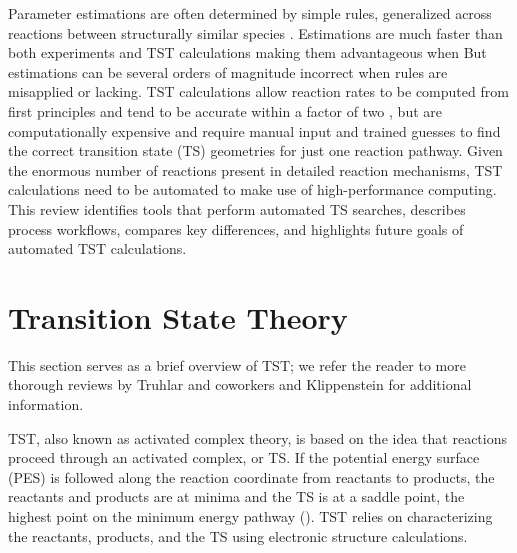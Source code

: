\documentclass[preprint, 11pt]{elsarticle} %
\begin{document}
Parameter estimations are often determined by simple rules, generalized across reactions between structurally similar species \cite{Curran:1998bx, cai:2014}. 
Estimations are much faster than both experiments and TST calculations making them advantageous when 
But estimations can be several orders of magnitude incorrect when rules are misapplied or lacking.
TST calculations allow reaction rates to be computed from first principles and tend to be accurate within a factor of two \cite{fernandez:2006, Klippenstein:2017eu}, but are computationally expensive and require manual input and trained guesses to find the correct transition state (TS) geometries for just one reaction pathway. 
Given the enormous number of reactions present in detailed reaction mechanisms, TST calculations need to be automated to make use of high-performance computing.
This review identifies tools that perform automated TS searches, describes process workflows, compares key differences, and highlights future goals of automated TST calculations.


\section{Transition State Theory}



This section serves as a brief overview of TST; we refer the reader to more thorough reviews by Truhlar and coworkers \cite{truhlar:1996} and Klippenstein \cite{Klippenstein:2017eu} for additional information.

TST, also known as activated complex theory, is based on the idea that reactions proceed through an activated complex, or TS.
If the potential energy surface (PES) is followed along the reaction coordinate from reactants to products, the reactants and products are at minima and the TS is at a saddle point, the highest point on the minimum energy pathway (). 
TST relies on characterizing the reactants, products, and the TS using electronic structure calculations.
\end{document}
